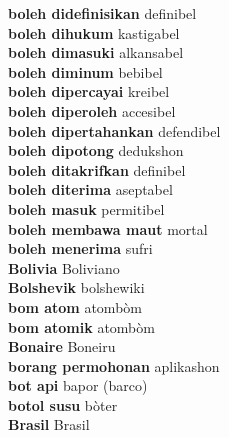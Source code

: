 \textbf{ boleh didefinisikan  } definibel \\
\textbf{ boleh dihukum  } kastigabel \\
\textbf{ boleh dimasuki  } alkansabel \\
\textbf{ boleh diminum  } bebibel \\
\textbf{ boleh dipercayai  } kreibel \\
\textbf{ boleh diperoleh  } accesibel \\
\textbf{ boleh dipertahankan  } defendibel \\
\textbf{ boleh dipotong  } dedukshon \\
\textbf{ boleh ditakrifkan  } definibel \\
\textbf{ boleh diterima  } aseptabel \\
\textbf{ boleh masuk  } permitibel \\
\textbf{ boleh membawa maut  } mortal \\
\textbf{ boleh menerima  } sufri \\
\textbf{ Bolivia  } Boliviano \\
\textbf{ Bolshevik  } bolshewiki \\
\textbf{ bom atom  } atombòm \\
\textbf{ bom atomik  } atombòm \\
\textbf{ Bonaire  } Boneiru \\
\textbf{ borang permohonan  } aplikashon \\
\textbf{ bot api  } bapor (barco) \\
\textbf{ botol susu  } bòter \\
\textbf{ Brasil  } Brasil \\
